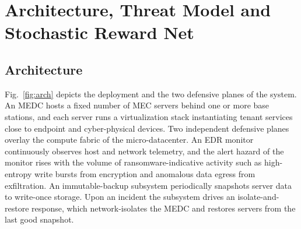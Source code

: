 \documentclass[journal]{IEEEtran}
\begin{document}
\section{Architecture, Threat Model and Stochastic Reward Net}\label{sec:model}

\subsection{Architecture}
Fig.~\ref{fig:arch} depicts the deployment and the two defensive planes of the
system. An MEDC hosts a fixed number of MEC
servers behind one or more base stations, and each server runs a virtualization
stack instantiating tenant services close to endpoint and cyber-physical
devices. Two independent defensive planes overlay the compute fabric of the
micro-datacenter. An EDR monitor
continuously observes host and network telemetry, and the alert hazard of the
monitor rises with the volume of ransomware-indicative activity such as
high-entropy write bursts from encryption and anomalous data egress from
exfiltration. An immutable-backup subsystem periodically snapshots server data
to write-once storage. Upon an incident the subsystem drives an
isolate-and-restore response, which network-isolates the MEDC and restores
servers from the last good snapshot.
\end{document}
